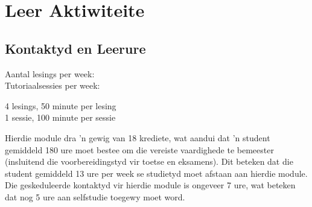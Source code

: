 \section{Leer Aktiwiteite}
    \subsection{Kontaktyd en Leerure}
        \begin{minipage}{0.4\linewidth}
            Aantal lesings per week: \\
            Tutoriaalsessies per week:
        \end{minipage}
        \begin{minipage}{0.4\linewidth}
            4 lesings, 50 minute per lesing \\
            1 sessie, 100 minute per sessie
        \end{minipage}

        Hierdie module dra 'n gewig van 18 krediete, wat aandui dat 'n student
        gemiddeld 180 ure moet bestee om die vereiste vaardighede te bemeester
        (insluitend die voorbereidingstyd vir toetse en eksamens).  Dit beteken
        dat die student gemiddeld 13 ure per week se studietyd moet afstaan aan
        hierdie module.  Die geskeduleerde kontaktyd vir hierdie module is
        ongeveer 7 ure, wat beteken dat nog 5 ure aan selfstudie toegewy moet
        word.

